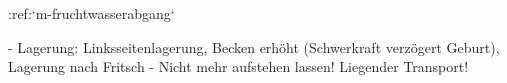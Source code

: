 :ref:`m-fruchtwasserabgang`
\begin{itemize}
    -   Lagerung: Linksseitenlagerung, Becken erhöht
    (Schwerkraft verzögert Geburt), Lagerung nach Fritsch
    -   Nicht mehr aufstehen lassen! Liegender Transport!
\end{itemize}